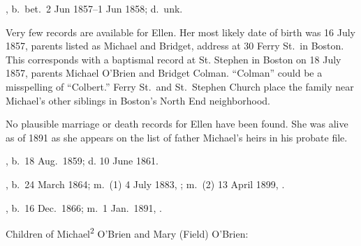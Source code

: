 \begin{Kids}
	
	, b.\ bet.\ 2 Jun 1857--1 Jun 1858;\cite{Census1870Ellen3OBrien2,Census1880Ellen3OBrien2} d.\ unk.
	
	\begin{KidsMoreText}
		Very few records are available for Ellen. Her most likely date of birth was 16 July 1857, parents listed as Michael and Bridget, address at 30 Ferry St.\ in Boston.\cite{Ellen3OBrien2Birth} This corresponds with a baptismal record at St. Stephen in Boston on 18 July 1857, parents Michael O'Brien and Bridget Colman.\cite{Ellen3OBrien2Baptism} ``Colman'' could be a misspelling of ``Colbert.'' Ferry St.\ and St.\ Stephen Church place the family near Michael's other siblings in Boston's North End neighborhood.\cite{Boston1861Map}
		
		No plausible marriage or death records for Ellen have been found. She was alive as of 1891 as she appears on the list of father Michael's heirs in his probate file.\cite{Michael2OBrienProbate}
	\end{KidsMoreText}
	
	, b.\ 18 Aug.\ 1859;\cite{MaryAnn3OBrien2Birth} d. 10 June 1861.\cite{MaryAnn3OBrien2Death}
	
	, b.\ 24 March 1864; m.\ (1) 4 July 1883, ; m.\ (2) 13 April 1899, .
	
	, b.\ 16 Dec.\ 1866; m.\ 1 Jan.\ 1891, .
	
\end{Kids}

\begin{KidsIntro}
	Children of Michael\textsuperscript{2} O'Brien and Mary (Field) O'Brien:
\end{KidsIntro}

